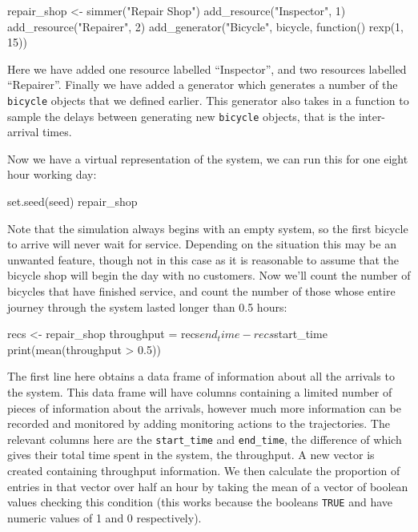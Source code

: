 \begin{Rin}
repair_shop <-
  simmer("Repair Shop") %
  add_resource("Inspector", 1) %
  add_resource("Repairer", 2) %
  add_generator("Bicycle", bicycle, function() {rexp(1, 15)})
\end{Rin}

Here we have added one resource labelled ``Inspector'', and two resources
labelled ``Repairer''. Finally we have added a generator which generates a
number of the \texttt{bicycle} objects that we defined earlier. This
generator also takes in a function to sample the delays between generating new 
\texttt{bicycle} objects, that is the inter-arrival times. 

Now we have a virtual representation of the system, we can run this for one
eight hour working day:

\begin{Rin}
set.seed(seed)
repair_shop %
\end{Rin}

Note that the simulation always begins with an empty system, so the first
bicycle to arrive will never wait for service. Depending on the situation this
may be an unwanted feature, though not in this case as it is reasonable to
assume that the bicycle shop will begin the day with no customers.
Now we'll count the number of bicycles that have finished service, and count the
number of those whose entire journey through the system lasted longer than 0.5
hours:

\begin{Rin}
recs <- repair_shop %
throughput = recs$end_time - recs$start_time
print(mean(throughput > 0.5))
\end{Rin}

The first line here obtains a data frame of information about all the arrivals
to the system.
This data frame will have columns containing a limited number of pieces of
information about the arrivals, however much more information can be recorded
and monitored by adding monitoring actions to the trajectories. The relevant
columns here are the \texttt{start_time} and \texttt{end_time},
the difference of which gives their total time spent in the system, the
throughput. A new vector is created containing throughput information.
We then calculate the proportion of entries in that vector over half an hour by
taking the mean of a vector of boolean values checking this condition (this
works because the booleans \texttt{TRUE} and  have
numeric values of 1 and 0 respectively).

